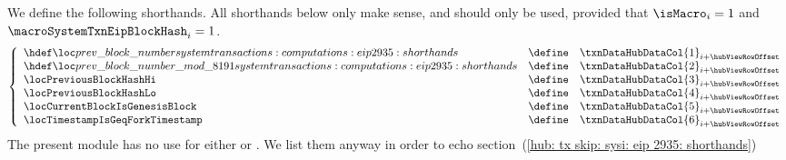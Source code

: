 We define the following shorthands.
All shorthands below only make sense, and should only be used, provided that
$\isMacro               _{i} = 1$ and
$\macroSystemTxnEipBlockHash _{i} = 1$.
\[
	\left\{ \begin{array}{lcl}
		\locPreviousBlockNumber            & \define & \txnDataHubDataCol {1} _{i + \hubViewRowOffset} \\
		\locPreviousBlockNumberModuloPrime & \define & \txnDataHubDataCol {2} _{i + \hubViewRowOffset} \\
		\locPreviousBlockHashHi            & \define & \txnDataHubDataCol {3} _{i + \hubViewRowOffset} \\
		\locPreviousBlockHashLo            & \define & \txnDataHubDataCol {4} _{i + \hubViewRowOffset} \\
		\locCurrentBlockIsGenesisBlock     & \define & \txnDataHubDataCol {5} _{i + \hubViewRowOffset} \\
		\locTimestampIsGeqForkTimestamp    & \define & \txnDataHubDataCol {6} _{i + \hubViewRowOffset} \\
	\end{array} \right.
\]
\saNote{}
The present module has no use for either
\locPreviousBlockHashHi{} or
\locPreviousBlockHashLo{}.
We list them anyway in order to echo
section~(\ref{hub: tx skip: sysi: eip 2935: shorthands})
